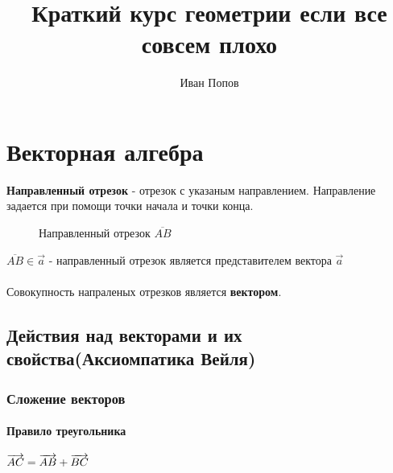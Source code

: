 \documentclass{article}
\title{Краткий курс геометрии если все совсем плохо}
\author{Иван Попов}
\begin{document}
\maketitle
\newpage
{}

\tableofcontents

\newpage

\section{Векторная алгебра}
\textbf{Направленный отрезок} - отрезок с указаным направлением. Направление задается при помощи точки начала и точки конца.\\
\begin{figure}[h!]
    \centering

\caption{Направленный отрезок $\overline{AB}$}
\end{figure}
$\overline{AB} \in \overrightarrow{a}$ - направленный отрезок является представителем вектора $\overrightarrow{a}$
\\
\\
Совокупность напраленых отрезков является \textbf{вектором}.
\subsection{Действия над векторами и их свойства(Аксиомпатика Вейля)}
\subsubsection{Сложение векторов}
\paragraph{Правило треугольника}
$\\\\\overrightarrow{AC}=\overrightarrow{AB}+\overrightarrow{BC}$
\begin{figure}[h!]
\end{figure}
\end{document}
